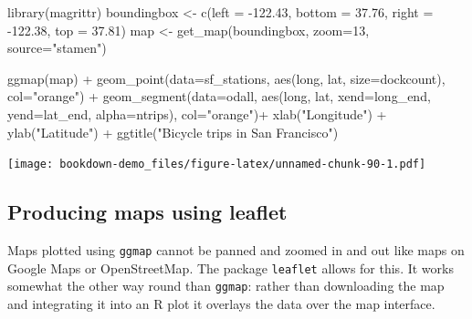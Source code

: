 \documentclass[
]{book}
\newenvironment{Shaded}{\begin{snugshade}}{\end{snugshade}}
\newcommand{\AttributeTok}[1]{\textcolor[rgb]{0.77,0.63,0.00}{#1}}
\newcommand{\DecValTok}[1]{\textcolor[rgb]{0.00,0.00,0.81}{#1}}
\newcommand{\FloatTok}[1]{\textcolor[rgb]{0.00,0.00,0.81}{#1}}
\newcommand{\FunctionTok}[1]{\textcolor[rgb]{0.00,0.00,0.00}{#1}}
\newcommand{\NormalTok}[1]{#1}
\newcommand{\OtherTok}[1]{\textcolor[rgb]{0.56,0.35,0.01}{#1}}
\newcommand{\SpecialCharTok}[1]{\textcolor[rgb]{0.00,0.00,0.00}{#1}}
\newcommand{\StringTok}[1]{\textcolor[rgb]{0.31,0.60,0.02}{#1}}
\begin{document}
\begin{Shaded}
\begin{Highlighting}[]
\FunctionTok{library}\NormalTok{(magrittr)}
\NormalTok{boundingbox }\OtherTok{\textless{}{-}} \FunctionTok{c}\NormalTok{(}\AttributeTok{left =} \SpecialCharTok{{-}}\FloatTok{122.43}\NormalTok{, }\AttributeTok{bottom =} \FloatTok{37.76}\NormalTok{, }\AttributeTok{right =} \SpecialCharTok{{-}}\FloatTok{122.38}\NormalTok{, }\AttributeTok{top =} \FloatTok{37.81}\NormalTok{)}
\NormalTok{map }\OtherTok{\textless{}{-}} \FunctionTok{get\_map}\NormalTok{(boundingbox, }\AttributeTok{zoom=}\DecValTok{13}\NormalTok{, }\AttributeTok{source=}\StringTok{"stamen"}\NormalTok{)}



\FunctionTok{ggmap}\NormalTok{(map) }\SpecialCharTok{+} 
    \FunctionTok{geom\_point}\NormalTok{(}\AttributeTok{data=}\NormalTok{sf\_stations, }\FunctionTok{aes}\NormalTok{(long, lat, }\AttributeTok{size=}\NormalTok{dockcount), }\AttributeTok{col=}\StringTok{"orange"}\NormalTok{) }\SpecialCharTok{+}
    \FunctionTok{geom\_segment}\NormalTok{(}\AttributeTok{data=}\NormalTok{odall, }\FunctionTok{aes}\NormalTok{(long, lat, }\AttributeTok{xend=}\NormalTok{long\_end, }\AttributeTok{yend=}\NormalTok{lat\_end, }\AttributeTok{alpha=}\NormalTok{ntrips), }\AttributeTok{col=}\StringTok{"orange"}\NormalTok{)}\SpecialCharTok{+}
    \FunctionTok{xlab}\NormalTok{(}\StringTok{"Longitude"}\NormalTok{) }\SpecialCharTok{+} \FunctionTok{ylab}\NormalTok{(}\StringTok{"Latitude"}\NormalTok{) }\SpecialCharTok{+} 
    \FunctionTok{ggtitle}\NormalTok{(}\StringTok{"Bicycle trips in San Francisco"}\NormalTok{)}
\end{Highlighting}
\end{Shaded}

\texttt{[image: bookdown-demo\_files/figure-latex/unnamed-chunk-90-1.pdf]}

\hypertarget{producing-maps-using-leaflet}{%
\subsection{Producing maps using leaflet}\label{producing-maps-using-leaflet}}

Maps plotted using \texttt{ggmap} cannot be panned and zoomed in and out like maps on Google Maps or OpenStreetMap. The package \texttt{leaflet} allows for this. It works somewhat the other way round than \texttt{ggmap}: rather than downloading the map and integrating it into an R plot it overlays the data over the map interface.
\end{document}
